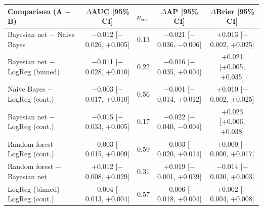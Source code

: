 \begin{tabular}{lcccc}
\toprule
Comparison (A $-$ B) & $\Delta$AUC [95\% CI] & $p_{\mathrm{corr}}$ & $\Delta$AP [95\% CI] & $\Delta$Brier [95\% CI] \\
\midrule
Bayesian net $-$ Naive Bayes & $-$0.012 [$-$0.026, +0.005] & 0.13 & $-$0.021 [$-$0.036, $-$0.006] & +0.013 [$-$0.002, +0.025] \\
Bayesian net $-$ LogReg (binned) & $-$0.011 [$-$0.028, +0.010] & 0.22 & $-$0.016 [$-$0.035, +0.004] & +0.021 [+0.005, +0.035] \\
Naive Bayes $-$ LogReg (cont.) & $-$0.003 [$-$0.017, +0.010] & 0.56 & $-$0.001 [$-$0.014, +0.012] & +0.010 [$-$0.002, +0.025] \\
Bayesian net $-$ LogReg (cont.) & $-$0.015 [$-$0.033, +0.005] & 0.17 & $-$0.022 [$-$0.040, $-$0.004] & +0.023 [+0.006, +0.038] \\
Random forest $-$ LogReg (cont.) & $-$0.003 [$-$0.015, +0.009] & 0.59 & $-$0.003 [$-$0.020, +0.014] & +0.009 [$-$0.000, +0.017] \\
Random forest $-$ Bayesian net & +0.012 [$-$0.008, +0.029] & 0.31 & +0.019 [$-$0.001, +0.039] & $-$0.014 [$-$0.030, +0.003] \\
LogReg (binned) $-$ LogReg (cont.) & $-$0.004 [$-$0.013, +0.004] & 0.57 & $-$0.006 [$-$0.018, +0.004] & +0.002 [$-$0.004, +0.008] \\
\bottomrule
\end{tabular}
